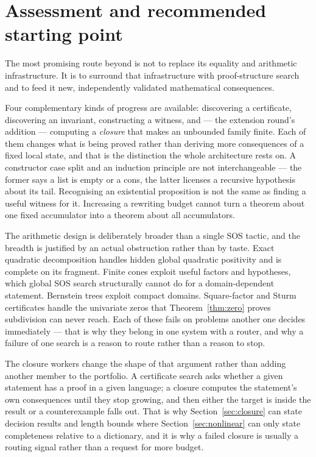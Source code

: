 \section{Assessment and recommended starting point}

The most promising route beyond \grind{} is not to replace its equality and
arithmetic infrastructure. It is to surround that infrastructure with
proof-structure search and to feed it new, independently validated mathematical
consequences.

Four complementary kinds of progress are available: discovering a certificate,
discovering an invariant, constructing a witness, and --- the extension round's
addition --- computing a \emph{closure} that makes an unbounded family finite. Each of them changes what
is being proved rather than deriving more consequences of a fixed local state,
and that is the distinction the whole architecture rests on. A constructor case
split and an induction principle are not interchangeable --- the former says a
list is empty or a cons, the latter licenses a recursive hypothesis about its
tail. Recognising an existential proposition is not the same as finding a useful
witness for it. Increasing a rewriting budget cannot turn a theorem about one
fixed accumulator into a theorem about all accumulators.

The arithmetic design is deliberately broader than a single SOS tactic, and the
breadth is justified by an actual obstruction rather than by taste. Exact
quadratic decomposition handles hidden global quadratic positivity and is
complete on its fragment. Finite cones exploit useful factors and hypotheses,
which global SOS search structurally cannot do for a domain-dependent statement.
Bernstein trees exploit compact domains. Square-factor and Sturm certificates
handle the univariate zeros that Theorem~\ref{thm:zero} proves subdivision can
never reach. Each of these fails on problems another one decides immediately ---
that is why they belong in one system with a router, and why a failure of one
search is a reason to route rather than a reason to stop.

The closure workers change the shape of that argument rather than adding another
member to the portfolio. A certificate search asks whether a given statement has
a proof in a given language; a closure computes the statement's own consequences
until they stop growing, and then either the target is inside the result or a
counterexample falls out. That is why Section~\ref{sec:closure} can state
decision results and length bounds where Section~\ref{sec:nonlinear} can only
state completeness relative to a dictionary, and it is why a failed closure is
usually a routing signal rather than a request for more budget.

